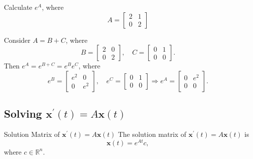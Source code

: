 \begin{example}{}{}
  Calculate $e^{A}$, where
  \begin{equation}
    A =
    \begin{bmatrix}
      2 & 1\\
      0 & 2
    \end{bmatrix}
  \end{equation}
\end{example}

\begin{solution}
  Consider $A = B + C$, where
  \begin{equation}
    B =
    \begin{bmatrix}
      2 & 0\\
      0 & 2
    \end{bmatrix}, \quad
    C =
    \begin{bmatrix}
      0 & 1\\
      0 & 0
    \end{bmatrix}.
  \end{equation}
  Then $e^A = e^{B + C} = e^B e^C$, where
  \begin{equation}
    e^B =
    \begin{bmatrix}
      e^2 & 0\\
      0 & e^2
    \end{bmatrix}, \quad
    e^C =
    \begin{bmatrix}
      0 & 1\\
      0 & 0
    \end{bmatrix}
    \Rightarrow
    e^A =
    \begin{bmatrix}
      0 & e^2\\
      0 & 0
    \end{bmatrix}.
  \end{equation}
\end{solution}

\subsection{Solving $\mathbf{x}^{\prime}(t) = A \mathbf{x}(t)$}

\begin{proposition}{Solution Matrix of $\mathbf{x}^{\prime}(t) = A \mathbf{x}(t)$}{}
  The solution matrix of $\mathbf{x}^{\prime}(t) = A \mathbf{x}(t)$ is
  \begin{equation}
    \mathbf{x}(t) = e^{At} c,
  \end{equation}
  where $c \in \mathbb{R}^n$.
\end{proposition}

